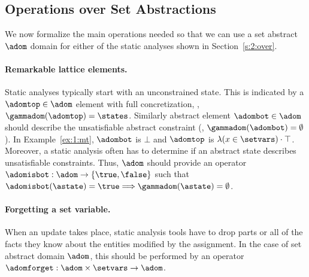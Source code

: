 \subsection{Operations over Set Abstractions}
\label{s:3:2:sign}
We now formalize the main operations needed so that we can use
a set abstract \( \adom \) domain for either of the static analyses shown
in Section~\ref{s:2:over}.

\paragraph{Remarkable lattice elements.}
Static analyses typically start with an unconstrained state.
This is indicated by a \( \adomtop \in \adom \) element with full
concretization, \ie, \( \gammadom( \adomtop ) = \states \).
Similarly abstract element \( \adombot \in \adom \) should describe
the unsatisfiable abstract constraint (\ie, \( \gammadom( \adombot ) =
\emptyset \)).
In Example~\ref{ex:1:mt}, \( \adombot \) is \( \bot \) and \( \adomtop \)
is \( \lambda (x \in \setvars) \cdot \top \).
Moreover, a static analysis often has to determine if an abstract state
describes unsatisfiable constraints.
Thus, \( \adom \) should provide an operator \( \adomisbot: \adom
\rightarrow \{ \true, \false \} \) such that \( \adomisbot( \astate )
= \true \Longrightarrow \gammadom( \astate ) = \emptyset \).

\paragraph{Forgetting a set variable.}
When an update takes place, static analysis tools have to drop parts or
all of the facts they know about the entities modified by the assignment.
In the case of set abstract domain \( \adom \), this should be performed
by an operator \( \adomforget: \adom \times \setvars \rightarrow \adom \).

